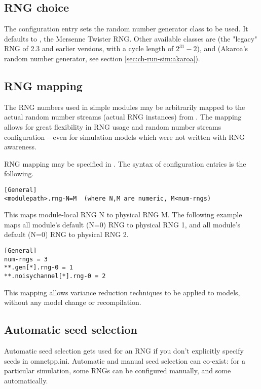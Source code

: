 \subsection{RNG choice}

The  configuration entry sets the random number
generator class to be used. It defaults to ,
the Mersenne Twister RNG. Other available classes are 
(the "legacy" RNG of {\opp} 2.3 and earlier versions, with a cycle length
of $2^{31}-2$), and  (Akaroa's random number generator,
see section \ref{sec:ch-run-sim:akaroa}).

\subsection{RNG mapping}

The RNG numbers used in simple modules may be arbitrarily mapped to the
actual random number streams (actual RNG instances) from .
The mapping allows for great flexibility in RNG usage and random number
streams configuration -- even for simulation models which were not
written with RNG awareness.

RNG mapping may be specified in . The syntax of
configuration entries is the following.

\begin{verbatim}
[General]
<modulepath>.rng-N=M  (where N,M are numeric, M<num-rngs)
\end{verbatim}

This maps module-local RNG N to physical RNG M. The following
example maps all   module's default (N=0) RNG to physical RNG 1,
and all   module's default (N=0) RNG to physical RNG 2.

\begin{verbatim}
[General]
num-rngs = 3
**.gen[*].rng-0 = 1
**.noisychannel[*].rng-0 = 2
\end{verbatim}

This mapping allows variance reduction techniques to be applied to
{\opp} models, without any model change or recompilation.


\subsection{Automatic seed selection}

Automatic seed selection gets used for an RNG if you don't explicitly
specify seeds in omnetpp.ini. Automatic and manual seed selection can
co-exist: for a particular simulation, some RNGs can be configured
manually, and some automatically.

